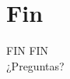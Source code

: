 \documentclass[aspectratio=169,english]{beamer}
\begin{document}
\section*{Fin}
\begin{frame}{FIN}
    \centering
    \Huge{FIN\\}
    \vspace{1cm}
    \LARGE{¿Preguntas?}
\end{frame}






     
\end{document}
